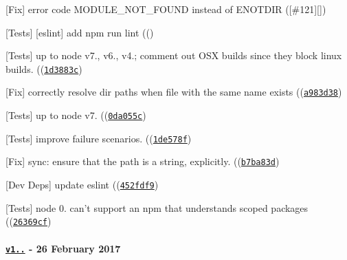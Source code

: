 \begin{DoxyItemize}
\item \mbox{[}Fix\mbox{]} error code M\+O\+D\+U\+L\+E\+\_\+\+N\+O\+T\+\_\+\+F\+O\+U\+ND instead of E\+N\+O\+T\+D\+IR (\mbox{[}{\ttfamily \#121}\mbox{]}\mbox{[}\mbox{]})
\item \mbox{[}Tests\mbox{]} \mbox{[}eslint\mbox{]} add {\ttfamily npm run lint} ((\href{https://github.com/browserify/resolve/commit/36779282881ec4abce32b2c9b7f7b10bcd09d953}{\tt {}})
\item \mbox{[}Tests\mbox{]} up to {\ttfamily node} {\ttfamily v7.}, {\ttfamily v6.}, {\ttfamily v4.}; comment out O\+SX builds since they block linux builds. ((\href{https://github.com/browserify/resolve/commit/1d3883c40d55242d7dfeafa43fa782dc6f4ab4a6}{\tt {\ttfamily 1d3883c}})
\item \mbox{[}Fix\mbox{]} correctly resolve dir paths when file with the same name exists ((\href{https://github.com/browserify/resolve/commit/a983d38c47ea26e57e0824f22929985ecb24faca}{\tt {\ttfamily a983d38}})
\item \mbox{[}Tests\mbox{]} up to {\ttfamily node} {\ttfamily v7.} ((\href{https://github.com/browserify/resolve/commit/0da055cc75bebd7e0044cd4184e7c5386a7bd7de}{\tt {\ttfamily 0da055c}})
\item \mbox{[}Tests\mbox{]} improve failure scenarios. ((\href{https://github.com/browserify/resolve/commit/1de578f2879f83ba94789041420fd3d3b929127e}{\tt {\ttfamily 1de578f}})
\item \mbox{[}Fix\mbox{]} {\ttfamily sync}\+: ensure that the path is a string, explicitly. ((\href{https://github.com/browserify/resolve/commit/b7ba83d43519c3c77af823ef1badd7f452d8b8e3}{\tt {\ttfamily b7ba83d}})
\item \mbox{[}Dev Deps\mbox{]} update {\ttfamily eslint} ((\href{https://github.com/browserify/resolve/commit/452fdf981330f96d7fef88805b24e40ea24a89e1}{\tt {\ttfamily 452fdf9}})
\item \mbox{[}Tests\mbox{]} node 0. can’t support an npm that understands scoped packages ((\href{https://github.com/browserify/resolve/commit/26369cfe6ce4eae7404f3c003c88618f098d6814}{\tt {\ttfamily 26369cf}})
\end{DoxyItemize}

\paragraph*{\href{https://github.com/browserify/resolve/compare/v1.2.1...v1.3.2}{\tt v1..} -\/ 26 February 2017}


